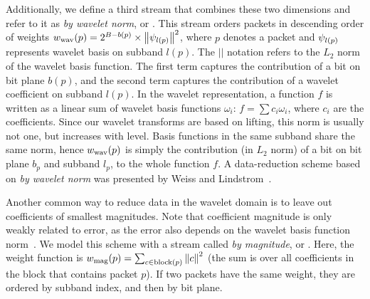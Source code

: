 Additionally, we define a third stream that combines these two dimensions and refer to it as
\emph{by wavelet norm}, or \swav. This stream orders packets in descending order of weights
$\wwav(p)=2^{B-b(p)}\times \norm{\wbas_{l(p)}}^2$, where $p$ denotes a packet and $\wbas_{l(p)}$
represents wavelet basis on subband $l(p)$. The $||$ notation refers to the $L_2$ norm of the
wavelet basis function. The first term captures the contribution of a bit on bit plane $b(p)$, and
the second term captures the contribution of a wavelet coefficient on subband $l(p)$.
%
%
In the wavelet representation, a function $f$ is written as a linear sum of wavelet basis functions
$\omega_i$: $f=\sum{c_i\omega_i}$, where $c_i$ are the coefficients. Since our wavelet transforms
are based on lifting, this norm is usually not one, but increases with level. Basis functions in the
same subband share the same norm, hence $\wwav(p)$ is simply the contribution (in $L_2$ norm) of a
bit on bit plane $b_p$ and subband $l_p$, to the whole function $f$. A data-reduction scheme based
on \emph{by wavelet norm} was presented by Weiss and Lindstrom~\cite{weiss}.

Another common way to reduce data in the wavelet domain is to leave out coefficients of smallest
magnitudes. Note that coefficient magnitude is only weakly related to error, as the error also
depends on the wavelet basis function norm~\cite{weiss}. We model this scheme with a stream called
\emph{by magnitude}, or \smag. Here, the weight function is $\wmag(p)=\sum_{c\in
\text{block}(p)}\norm{c}^2$ (the sum is over all coefficients in the block that contains packet
$p$). If two packets have the same weight, they are ordered by subband index, and then by bit plane.

